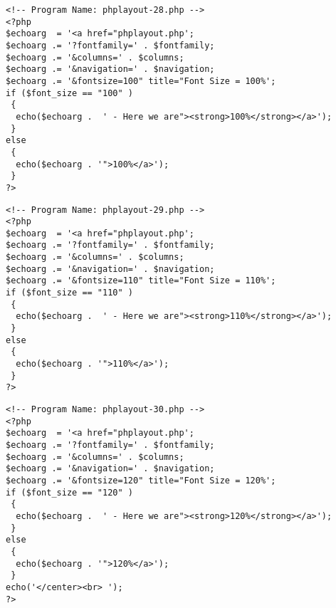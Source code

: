 \documentclass[12pt,a4paper,twosides,ngerman]{scrbook}
\begin{document}
\begin{center}
\begin{minipage}[t]{155mm}
\begin{lstlisting}[captionpos=b, caption=Layout - phplayout-28.php]
<!-- Program Name: phplayout-28.php -->
<?php
$echoarg  = '<a href="phplayout.php';
$echoarg .= '?fontfamily=' . $fontfamily; 
$echoarg .= '&columns=' . $columns;
$echoarg .= '&navigation=' . $navigation;
$echoarg .= '&fontsize=100" title="Font Size = 100%';
if ($font_size == "100" )
 {
  echo($echoarg .  ' - Here we are"><strong>100%</strong></a>');
 }
else
 {
  echo($echoarg . '">100%</a>');
 }
?>
\end{lstlisting}
\end{minipage}
\end{center} 

\begin{center}
\begin{minipage}[t]{155mm}
\begin{lstlisting}[captionpos=b, caption=Layout - phplayout-29.php]
<!-- Program Name: phplayout-29.php -->
<?php
$echoarg  = '<a href="phplayout.php';
$echoarg .= '?fontfamily=' . $fontfamily; 
$echoarg .= '&columns=' . $columns;
$echoarg .= '&navigation=' . $navigation;
$echoarg .= '&fontsize=110" title="Font Size = 110%';
if ($font_size == "110" )
 {
  echo($echoarg .  ' - Here we are"><strong>110%</strong></a>');
 }
else
 {
  echo($echoarg . '">110%</a>');
 }
?>
\end{lstlisting}
\end{minipage}
\end{center} 

\begin{center}
\begin{minipage}[t]{155mm}
\begin{lstlisting}[captionpos=b, caption=Layout - phplayout-30.php]
<!-- Program Name: phplayout-30.php -->
<?php
$echoarg  = '<a href="phplayout.php';
$echoarg .= '?fontfamily=' . $fontfamily; 
$echoarg .= '&columns=' . $columns;
$echoarg .= '&navigation=' . $navigation;
$echoarg .= '&fontsize=120" title="Font Size = 120%';
if ($font_size == "120" )
 {
  echo($echoarg .  ' - Here we are"><strong>120%</strong></a>');
 }
else
 {
  echo($echoarg . '">120%</a>');
 }
echo('</center><br> ');
?>
\end{lstlisting}
\end{minipage}
\end{center} 
\end{document}
